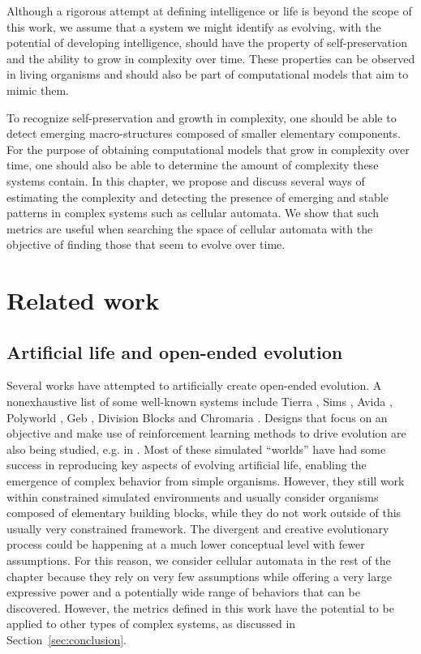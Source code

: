Although a rigorous attempt at defining intelligence or life is beyond the scope
of this work, we assume that a system we might identify as evolving, with the
potential of developing intelligence, should have the property of
self-preservation and the ability to grow in complexity over time. These
properties can be observed in living organisms
\parencite{bookerPerspectivesAdaptationNatural2004} and should also be part of
computational models that aim to mimic them.

To recognize self-preservation and growth in complexity, one should be able to
detect emerging macro-structures composed of smaller elementary components. For
the purpose of obtaining computational models that grow in complexity over time,
one should also be able to determine the amount of complexity these systems
contain. In this chapter, we propose and discuss several ways of estimating the
complexity and detecting the presence of emerging and stable patterns in complex
systems such as cellular automata. We show that such metrics are useful when
searching the space of cellular automata with the objective of finding those
that seem to evolve over time.

\section{Related work}

\subsection{Artificial life and open-ended evolution}

Several works have attempted to artificially create open-ended evolution. A
nonexhaustive list of some well-known systems include Tierra
\parencite{srayApproachSynthesisLife1991}, Sims
\parencite{simsEvolvingVirtualCreatures1994}, Avida
\parencite{ofriaAvidaSoftwarePlatform2004}, Polyworld
\parencite{yaegerComputationalGeneticsPhysiology1994}, Geb
\parencite{channonImprovingStillPassing2003}, Division Blocks
\parencite{spectorDivisionBlocksOpenended2007} and Chromaria
\parencite{sorosIdentifyingNecessaryConditions2014}. Designs that focus on an objective and make use of reinforcement learning methods to drive evolution
are also being studied, e.g. in
\parencite{pathakLearningControlSelfAssembling2019}. Most of these simulated
``worlds'' have had some success in reproducing key aspects of evolving
artificial life, enabling the emergence of complex behavior from simple
organisms. However, they still work within constrained simulated environments
and usually consider organisms composed of elementary building blocks, while
they do not work outside of this usually very constrained framework. The divergent
and creative evolutionary process could be happening at a much lower conceptual
level with fewer assumptions. For this reason, we consider cellular automata in
the rest of the chapter because they rely on very few assumptions while
offering a very large expressive power and a potentially wide range of behaviors
that can be discovered. However, the metrics defined in this work have the
potential to be applied to other types of complex systems, as discussed in
Section~\ref{sec:conclusion}.

